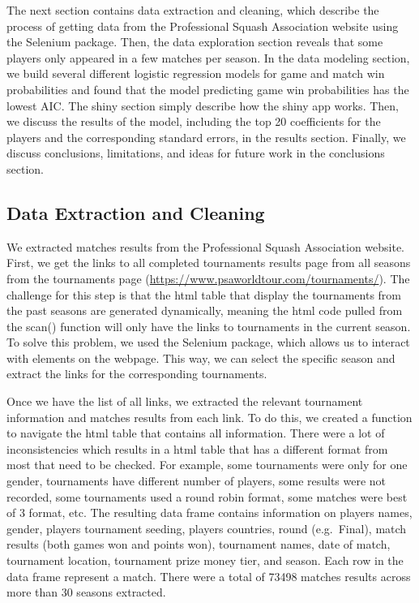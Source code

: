 \documentclass[
]{article}
\begin{document}
The next section contains data extraction and cleaning, which describe
the process of getting data from the Professional Squash Association
website using the Selenium package. Then, the data exploration section
reveals that some players only appeared in a few matches per season. In
the data modeling section, we build several different logistic
regression models for game and match win probabilities and found that
the model predicting game win probabilities has the lowest AIC. The
shiny section simply describe how the shiny app works. Then, we discuss
the results of the model, including the top 20 coefficients for the
players and the corresponding standard errors, in the results section.
Finally, we discuss conclusions, limitations, and ideas for future work
in the conclusions section.

\hypertarget{data-extraction-and-cleaning}{%
\subsection{Data Extraction and
Cleaning}\label{data-extraction-and-cleaning}}

We extracted matches results from the Professional Squash Association
website. First, we get the links to all completed tournaments results
page from all seasons from the tournaments page
(\url{https://www.psaworldtour.com/tournaments/}). The challenge for
this step is that the html table that display the tournaments from the
past seasons are generated dynamically, meaning the html code pulled
from the scan() function will only have the links to tournaments in the
current season. To solve this problem, we used the Selenium package,
which allows us to interact with elements on the webpage. This way, we
can select the specific season and extract the links for the
corresponding tournaments.

Once we have the list of all links, we extracted the relevant tournament
information and matches results from each link. To do this, we created a
function to navigate the html table that contains all information. There
were a lot of inconsistencies which results in a html table that has a
different format from most that need to be checked. For example, some
tournaments were only for one gender, tournaments have different number
of players, some results were not recorded, some tournaments used a
round robin format, some matches were best of 3 format, etc. The
resulting data frame contains information on players names, gender,
players tournament seeding, players countries, round (e.g.~Final), match
results (both games won and points won), tournament names, date of
match, tournament location, tournament prize money tier, and season.
Each row in the data frame represent a match. There were a total of
73498 matches results across more than 30 seasons extracted.
\end{document}
